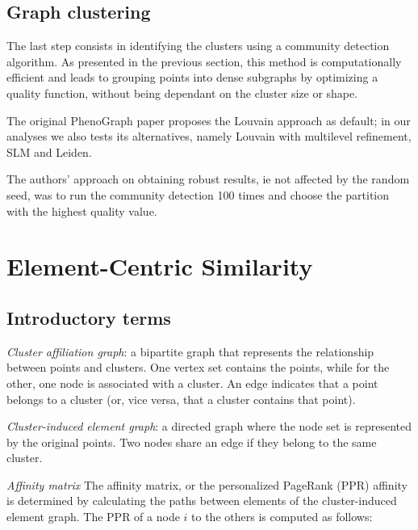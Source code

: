 

\subsection{Graph clustering}
The last step consists in identifying the clusters using a community detection algorithm. As presented in the previous section, this method is computationally efficient and leads to grouping points into dense subgraphs by optimizing a quality function, without being dependant on the cluster size or shape.

The original PhenoGraph paper proposes the Louvain approach as default; in our analyses we also tests its alternatives, namely Louvain with multilevel refinement, SLM and Leiden. 

The authors' approach on obtaining robust results, ie not affected by the random seed, was to run the community detection 100 times and choose the partition with the highest quality value.

\section{Element-Centric Similarity}
\subsection{Introductory terms}
\textit{Cluster affiliation graph}: a bipartite graph that represents the relationship between points and clusters. One vertex set contains the points, while for the other, one node is associated with a cluster. An edge indicates that a point belongs to a cluster (or, vice versa, that a cluster contains that point).
    
\textit{Cluster-induced element graph}: a directed graph where the node set is represented by the original points. Two nodes share an edge if they belong to the same cluster.

\textit{Affinity matrix} The affinity matrix, or the personalized PageRank (PPR) affinity is determined by calculating the paths between elements of the cluster-induced element graph. The PPR of a node $i$ to the others is computed as follows:

